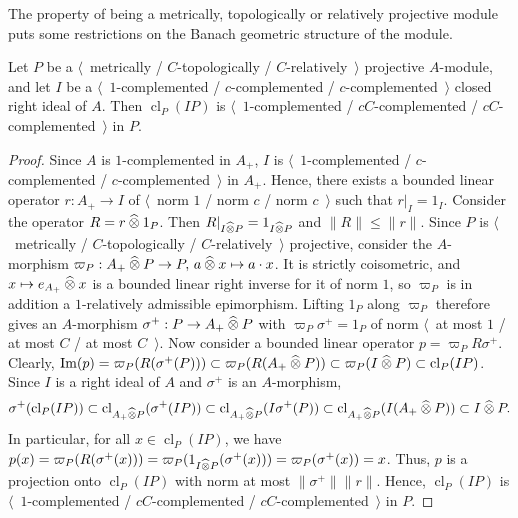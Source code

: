 The property of being a metrically, topologically or relatively projective module 
puts some restrictions on the Banach geometric structure of the module.

\begin{proposition}\label{MetTopRelProjModCompIdealPartCompl} Let $P$ 
be a $\langle$~metrically / $C$-topologically / $C$-relatively~$\rangle$ 
projective $A$-module, and let $I$ 
be a $\langle$~$1$-complemented / $c$-complemented / $c$-complemented~$\rangle$
closed right ideal of $A$. Then $\operatorname{cl}_P(I P)$ 
is $\langle$~$1$-complemented / $cC$-complemented / $cC$-complemented~$\rangle$ 
in $P$.
\end{proposition}
\begin{proof} Since $A$ is $1$-complemented in $A_+$, $I$ 
is $\langle$~$1$-complemented / $c$-complemented / $c$-complemented~$\rangle$
in $A_+$. Hence, there exists a bounded linear operator $r:A_+\to I$ of 
$\langle$~norm $1$ / norm $c$ / norm $c$~$\rangle$ such that $r|_I=1_I$. 
Consider the operator $R=r\mathbin{\widehat{\otimes}} 1_P$. Then $R|_{I\mathbin{\widehat{\otimes}} P}=1_{I\mathbin{\widehat{\otimes}} P}$ 
and $\lVert R\rVert\leq\lVert r\rVert$. Since $P$ 
is $\langle$~metrically / $C$-topologically / $C$-relatively~$\rangle$ 
projective, consider the $A$-morphism
$\varpi_P:A_+\mathbin{\widehat{\otimes}} P\to P,\, a\mathbin{\widehat{\otimes}} x\mapsto a\cdot x$. It is strictly
coisometric, and $x\mapsto e_{A_+}\mathbin{\widehat{\otimes}} x$ is a bounded linear right inverse
for it of norm $1$, so $\varpi_P$ is in addition a $1$-relatively admissible
epimorphism. Lifting $1_P$ along $\varpi_P$ therefore gives an $A$-morphism
$\sigma^+:P\to A_+\mathbin{\widehat{\otimes}} P$ with $\varpi_P\sigma^+=1_P$ of norm
$\langle$~at most $1$ / at most $C$ / at most $C$~$\rangle$. Now consider a 
bounded linear operator $p=\varpi_P R \sigma^+$. Clearly,
$\operatorname{Im}(p)=\varpi_P(R(\sigma^+(P)))
\subset\varpi_P(R(A_+\mathbin{\widehat{\otimes}} P))
\subset \varpi_P(I\mathbin{\widehat{\otimes}} P)
\subset \operatorname{cl}_P(I P)$.
Since $I$ is a right ideal of $A$ and $\sigma^+$ is an $A$-morphism, 
\[
\sigma^+(\operatorname{cl}_P(I P))
\subset \operatorname{cl}_{A_+\mathbin{\widehat{\otimes}} P}(\sigma^+(I P))
\subset \operatorname{cl}_{A_+\mathbin{\widehat{\otimes}} P}(I\sigma^+(P))
\subset \operatorname{cl}_{A_+\mathbin{\widehat{\otimes}} P}(I (A_+\mathbin{\widehat{\otimes}} P))
\subset I \mathbin{\widehat{\otimes}} P.
\]
In particular, for all $x\in \operatorname{cl}_P(I P)$, we have 
$p(x)
=\varpi_P(R(\sigma^+(x)))
=\varpi_P(1_{I\mathbin{\widehat{\otimes}} P}(\sigma^+(x)))
=\varpi_P(\sigma^+(x))
=x$. 
Thus, $p$ is a projection onto $\operatorname{cl}_P(I P)$ with norm at 
most $\lVert \sigma^+\rVert\lVert r\rVert$. Hence, $\operatorname{cl}_P(I P)$ 
is $\langle$~$1$-complemented / $cC$-complemented / 
$cC$-complemented~$\rangle$ in $P$.
\end{proof}

